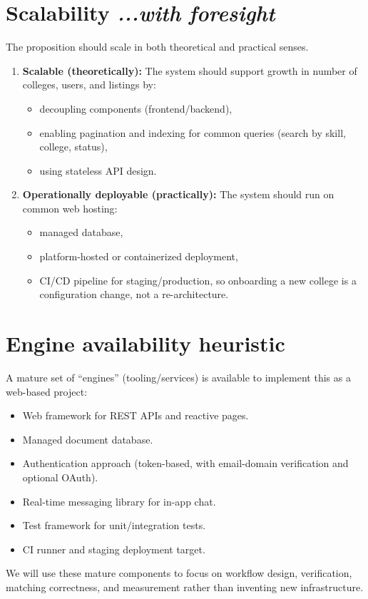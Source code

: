 \documentclass[11pt]{article}
\begin{document}
\section{Scalability \textit{...with foresight}}
The proposition should scale in both theoretical and practical senses.
\begin{enumerate}[leftmargin=*]
  \item \textbf{Scalable (theoretically):} The system should support growth in number of
  colleges, users, and listings by:
  \begin{itemize}
    \item decoupling components (frontend/backend),
    \item enabling pagination and indexing for common queries (search by skill, college, status),
    \item using stateless API design.
  \end{itemize}
  \item \textbf{Operationally deployable (practically):} The system should run on common web
  hosting:
  \begin{itemize}
    \item managed database,
    \item platform-hosted or containerized deployment,
    \item CI/CD pipeline for staging/production, so onboarding a new college is a
    configuration change, not a re-architecture.
  \end{itemize}
\end{enumerate}

\section{Engine availability heuristic}
A mature set of ``engines'' (tooling/services) is available to implement this as a web-based
project:
\begin{itemize}[leftmargin=*]
  \item Web framework for REST APIs and reactive pages.
  \item Managed document database.
  \item Authentication approach (token-based, with email-domain verification and optional OAuth).
  \item Real-time messaging library for in-app chat.
  \item Test framework for unit/integration tests.
  \item CI runner and staging deployment target.
\end{itemize}
We will use these mature components to focus on workflow design, verification, matching
correctness, and measurement rather than inventing new infrastructure.
\end{document}
